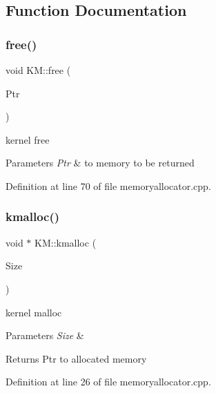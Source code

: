 \subsection{Function Documentation}
\mbox{\label{namespace_k_m_a08363437a217255f3f9d2a393a54714b}} 
\subsubsection{\texorpdfstring{free()}{free()}}
{\footnotesize\ttfamily void K\+M\+::free (\begin{DoxyParamCaption}\item[{void $\ast$}]{Ptr }\end{DoxyParamCaption})}



kernel free 


\begin{DoxyParams}{Parameters}
{\em Ptr} & to memory to be returned \\
\hline
\end{DoxyParams}


Definition at line 70 of file memoryallocator.\+cpp.

\mbox{\label{namespace_k_m_aaeb8403b430af6311bb3c1df6ae520b6}} 
\subsubsection{\texorpdfstring{kmalloc()}{kmalloc()}}
{\footnotesize\ttfamily void $\ast$ K\+M\+::kmalloc (\begin{DoxyParamCaption}\item[{size\+\_\+t}]{Size }\end{DoxyParamCaption})}



kernel malloc 


\begin{DoxyParams}{Parameters}
{\em Size} & \\
\hline
\end{DoxyParams}
\begin{DoxyReturn}{Returns}
Ptr to allocated memory 
\end{DoxyReturn}


Definition at line 26 of file memoryallocator.\+cpp.




